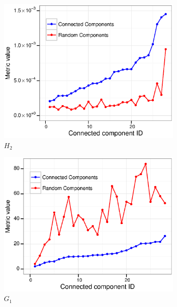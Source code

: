 \documentclass[10pt,letterpaper]{article}
\begin{document}
\begin{figure}
  \begin{subfigure}[b]{0.3\textwidth}
    \includegraphics[width=\textwidth]{figures_SI/Plots_from_data/cc_validation/H2.eps}
    \caption{$H_2$} \label{fig:H2}
  \end{subfigure}
  \begin{subfigure}[b]{0.3\textwidth}
    \includegraphics[width=\textwidth]{figures_SI/Plots_from_data/cc_validation/G1.eps}
    \caption{$G_1$} \label{fig:G1}
  \end{subfigure} ~ %
  \begin{subfigure}[b]{0.3\textwidth}

\end{subfigure}
\end{figure}
\end{document}
